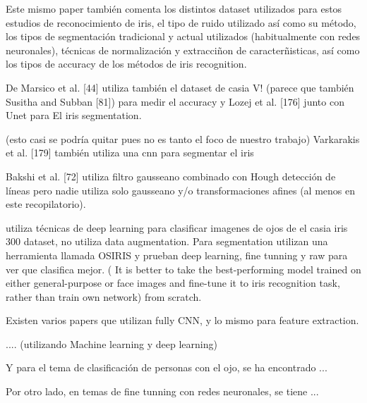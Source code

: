  Este mismo paper también comenta los distintos dataset utilizados para estos estudios de reconocimiento de iris, el tipo de ruido utilizado así como su método,
 los tipos de segmentación tradicional y actual utilizados (habitualmente con redes neuronales), técnicas de normalización y extracciñon de caracterñisticas, así 
 como los tipos de accuracy de los métodos de iris recognition.

 De Marsico et al. [44] utiliza también el dataset de casia V! (parece que también Susitha and Subban [81]) para medir el accuracy y Lozej et al. [176] junto con Unet para El
 iris segmentation.

(esto casi se podría quitar pues no es tanto el foco de nuestro trabajo) Varkarakis et al. [179] también utiliza una cnn para segmentar el iris

 Bakshi et al. [72] utiliza filtro gausseano combinado con Hough detección de líneas pero nadie utiliza solo gausseano y/o transformaciones afines (al menos en este
 recopilatorio).

 \cite{boyd_deep_2020} utiliza técnicas de deep learning para clasificar imagenes de ojos de el casia iris 300 dataset, no utiliza data augmentation. Para segmentation utilizan una herramienta
 llamada OSIRIS y prueban deep learning, fine tunning y raw para ver que clasifica mejor. ( It is better to take the best-performing model trained on either general-purpose or face images and
  fine-tune it to iris recognition task, rather than train own network)
 from scratch.
 

 Existen varios papers que utilizan fully CNN, y lo mismo para feature extraction.



.... (utilizando Machine learning y deep learning)

Y para el tema de clasificación de personas con el ojo, se ha encontrado ...

Por otro lado, en temas de fine tunning con redes neuronales, se tiene ...